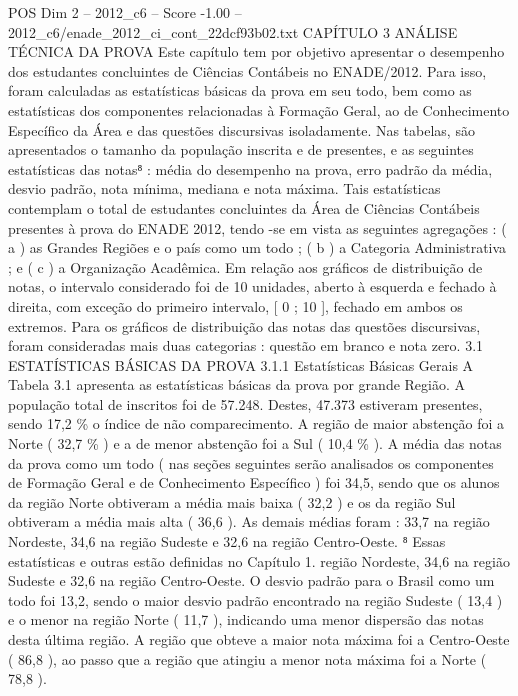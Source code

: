 \begin{textsample}{POS Dim 2 – 2012\_c6 – Score -1.00 – 2012\_c6/enade\_2012\_ci\_cont\_22dcf93b02.txt}  \label{ex:f2_pos_249}
CAPÍTULO 3 ANÁLISE TÉCNICA DA PROVA Este capítulo tem por objetivo apresentar o desempenho dos estudantes concluintes de Ciências Contábeis no ENADE/2012.
Para isso, foram calculadas as estatísticas básicas da prova em seu todo, bem como as estatísticas dos componentes relacionadas à Formação Geral, ao de Conhecimento Específico da Área e das questões discursivas isoladamente.
Nas tabelas, são apresentados o tamanho da população inscrita e de presentes, e as seguintes estatísticas das notas⁸ : média do desempenho na prova, erro padrão da média, desvio padrão, nota mínima, mediana e nota máxima.
Tais estatísticas contemplam o total de estudantes concluintes da Área de Ciências Contábeis presentes à prova do ENADE 2012, tendo -se em vista as seguintes agregações : ( a ) as Grandes Regiões e o país como um todo ; ( b ) a Categoria Administrativa ; e ( c ) a Organização Acadêmica.
Em relação aos gráficos de distribuição de notas, o intervalo considerado foi de 10 unidades, aberto à esquerda e fechado à direita, com exceção do primeiro intervalo, [ 0 ; 10 ], fechado em ambos os extremos.
Para os gráficos de distribuição das notas das questões discursivas, foram consideradas mais duas categorias : questão em branco e nota zero. 3.1 ESTATÍSTICAS BÁSICAS DA PROVA 3.1.1 Estatísticas Básicas Gerais A Tabela 3.1 apresenta as estatísticas básicas da prova por grande Região.
A população total de inscritos foi de 57.248.
Destes, 47.373 estiveram presentes, sendo 17,2 \% o índice de não comparecimento.
A região de maior abstenção foi a Norte ( 32,7 \% ) e a de menor abstenção foi a Sul ( 10,4 \% ).
A média das notas da prova como um todo ( nas seções seguintes serão analisados os componentes de Formação Geral e de Conhecimento Específico ) foi 34,5, sendo que os alunos da região Norte obtiveram a média mais baixa ( 32,2 ) e os da região Sul obtiveram a média mais alta ( 36,6 ).
As demais médias foram : 33,7 na região Nordeste, 34,6 na região Sudeste e 32,6 na região Centro-Oeste. ⁸ Essas estatísticas e outras estão definidas no Capítulo 1. região Nordeste, 34,6 na região Sudeste e 32,6 na região Centro-Oeste.
O desvio padrão para o Brasil como um todo foi 13,2, sendo o maior desvio padrão encontrado na região Sudeste ( 13,4 ) e o menor na região Norte ( 11,7 ), indicando uma menor dispersão das notas desta última região.
A região que obteve a maior nota máxima foi a Centro-Oeste ( 86,8 ), ao passo que a região que atingiu a menor nota máxima foi a Norte ( 78,8 ).

\end{textsample}
